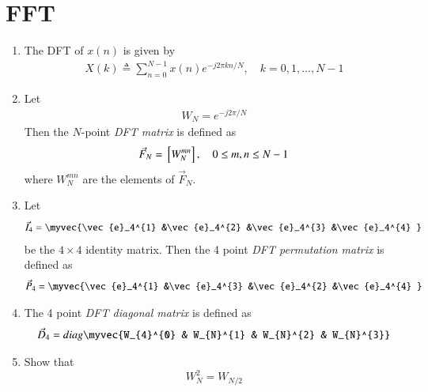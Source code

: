 \documentclass[journal,12pt,twocolumn]{IEEEtran}
\renewcommand\thesection{\arabic{section}}
\begin{document}
\section{FFT}
\begin{enumerate}[label=\arabic*.,ref=\thesection.\theenumi]
    \item The DFT of $x(n)$ is given by
    \begin{align}
        X(k) \triangleq \sum_{n=0}^{N-1} x(n) e^{-j 2 \pi k n / N}, \quad k=0,1, \ldots, N-1
    \end{align}
\item Let 
	\begin{align}
W_{N} = e^{-j2\pi/N} 
	\end{align}
		Then the $N$-point {\em DFT matrix} is defined as 
	\begin{align}
		\vec{F}_{N} = {}\left[W_{N}^{mn}\right], \quad 0 \le m,n \le N-1 
	\end{align}
	where $W_{N}^{mn}$ are the elements of $\vec{F}_{N}$.
\item Let 
	\begin{align}
		\vec{I}_4 = \myvec{\vec{e}_4^{1} &\vec{e}_4^{2} &\vec{e}_4^{3} &\vec{e}_4^{4} }
	\end{align}
		be the $4\times 4$ identity matrix.  Then the 4 point {\em DFT permutation matrix} is defined as 
	\begin{align}
		\vec{P}_4 = \myvec{\vec{e}_4^{1} &\vec{e}_4^{3} &\vec{e}_4^{2} &\vec{e}_4^{4} }
	\end{align}
\item The 4 point {\em DFT diagonal matrix} is defined as 
	\begin{align}
		\vec{D}_4 = diag\myvec{W_{4}^{0} & W_{N}^{1} & W_{N}^{2} & W_{N}^{3}}
	\end{align}
\item Show that 
\begin{equation}
    W_{N}^{2}=W_{N/2}
\end{equation}


\end{enumerate}
\end{document}
